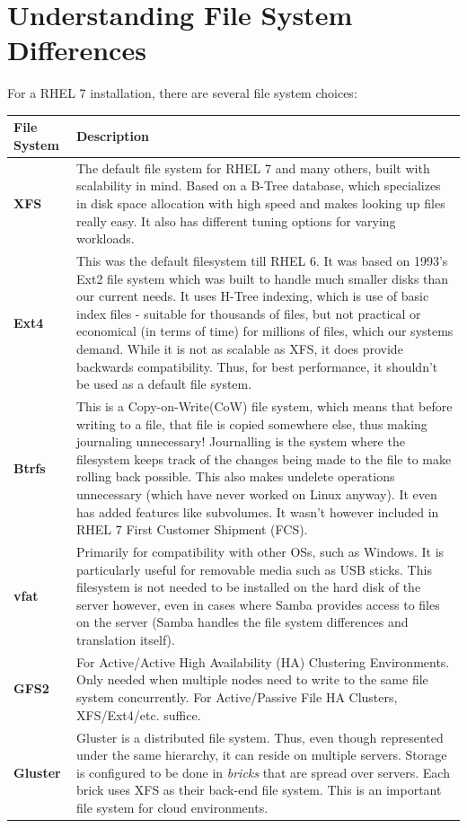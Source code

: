 \section{Understanding File System Differences}
For a RHEL 7 installation, there are several file system choices:

\noindent
\begin{tabular}{lM{0.84}}
	\toprule
	\textbf{File System} &\textbf{Description} \\
	\midrule
	\textbf{XFS}	&The default file system for RHEL 7 and many others, built with scalability in mind. Based on a B-Tree database, which specializes in disk space allocation with high speed and makes looking up files really easy. It also has different tuning options for varying workloads. \\
	\midrule
	\textbf{Ext4}	&This was the default filesystem till RHEL 6. It was based on 1993's Ext2 file system which was built to handle much smaller disks than our current needs. It uses H-Tree indexing, which is use of basic index files - suitable for thousands of files, but not practical or economical (in terms of time) for millions of files, which our systems demand. While it is not as scalable as XFS, it does provide backwards compatibility. Thus, for best performance, it shouldn't be used as a default file system. \\
	\midrule
	\textbf{Btrfs}	&This is a Copy-on-Write(CoW) file system, which means that before writing to a file, that file is copied somewhere else, thus making journaling unnecessary! Journalling is the system where the filesystem keeps track of the changes being made to the file to make rolling back possible. This also makes undelete operations unnecessary (which have never worked on Linux anyway). It even has added features like subvolumes. It wasn't however included in RHEL 7 First Customer Shipment (FCS). \\
	\midrule
	\textbf{vfat}	&Primarily for compatibility with other OSs, such as Windows. It is particularly useful for removable media such as USB sticks. This filesystem is not needed to be installed on the hard disk of the server however, even in cases where Samba provides access to files on the server (Samba handles the file system differences and translation itself). \\
	\midrule
	\textbf{GFS2}	&For Active/Active High Availability (HA) Clustering Environments. Only needed when multiple nodes need to write to the same file system concurrently. For Active/Passive File HA Clusters, XFS/Ext4/etc. suffice. \\
	\midrule
	\textbf{Gluster}	&Gluster is a distributed file system. Thus, even though represented under the same hierarchy, it can reside on multiple servers. Storage is configured to be done in \textit{bricks} that are spread over servers. Each brick uses XFS as their back-end file system. This is an important file system for cloud environments. \\
	\bottomrule
\end{tabular}

